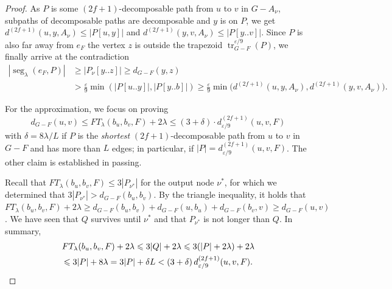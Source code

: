 \documentclass{article}\usepackage[a4paper,margin=20mm]{geometry}
\DeclareMathOperator{\tr}{tr}
\DeclareMathOperator{\seg}{seg}
\newcommand*{\length}[1]{|#1|}
\renewcommand{\leq}{\leqslant}
\renewcommand{\le}{\leqslant}
\renewcommand{\ge}{\geqslant}
\newcommand{\eps}{\varepsilon}
\begin{document}
\begin{proof}
As $P$ is some $(2f{+}1)$-decomposable path from $u$ to $v$ in $G-A_{\nu}$,
subpaths of decomposable paths are decomposable and $y$ is on $P$,
we get $d^{(2f+1)}(u,y,A_{\nu}) \le \length{P[u,y]}$ 
and $d^{(2f+1)}(y,v,A_{\nu}) \le \length{P[y..v]}$.
Since $P$ is also far away from $e_F$ the vertex $z$ is outside the trapezoid 
$\tr^{\eps/9}_{G-F}(P)$, we finally arrive at the contradiction
\begin{align*}
	\length{\seg_{\lambda}(e_F,P)} &\ge \length{P_{\nu}[y..z]} \ge d_{G-F}(y,z)\\
		&> \frac{\eps}{9} \min(\length{P[u..y]},\length{P[y..b]}) 
			\ge \frac{\varepsilon}{9} \min\!\big(d^{(2f+1)}(u,y,A_{\nu}), d^{(2f+1)}(y,v,A_{\nu})\big).
\end{align*}

For the approximation, we focus on proving 
\begin{equation*}
	d_{G-F}(u,v) \leq FT_{\lambda}(b_u,b_v,F) + 2\lambda 
	\leq (3{+}\delta) \cdot d^{(2f+1)}_{\eps/9}(u,v,F)
\end{equation*}
with $\delta = 8\lambda/L$
if $P$ is the \emph{shortest} $(2f{+}1)$-decomposable path from $u$ to $v$ in $G-F$
and has more than $L$ edges;
in particular, if $\length{P} = d^{(2f+1)}_{\eps/9}(u,v,F)$.
The other claim is established in passing.

Recall that $FT_{\lambda}(b_u,b_v,F) \le 3 \length{P_{\nu^*}}$ for the output node $\nu^*$,
for which we determined that $3 \length{P_{\nu^*}} > d_{G-F}(b_u,b_v)$.
By the triangle inequality, it holds that
$FT_{\lambda}(b_u,b_v,F) + 2\lambda \ge d_{G-F}(b_u,b_v) + d_{G-F}(u,b_u) + d_{G-F}(b_v,v) 
	\ge d_{G-F}(u,v)$.
%
We have seen that $Q$ survives until $\nu^*$ and that $P_{\nu^*}$ is not longer than $Q$.
In summary,
\begin{multline*}
	FT_{\lambda}(b_u,b_v,F) + 2\lambda \le 3 \length{Q} + 2\lambda
		 \le 3 (\length{P} + 2\lambda) + 2\lambda\\
		 \le 3 \length{P} + 8\lambda =  3 \length{P} + \delta L 
		 < (3+\delta) \, d^{(2f+1)}_{\eps/9}(u,v,F). \qedhere
\end{multline*}
\end{proof} 
\end{document}
